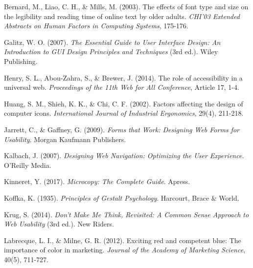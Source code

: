 \documentclass[12pt,a4paper,oneside]{article}
\begin{document}
\begin{flushleft}

Bernard, M., Liao, C. H., \& Mills, M. (2003). The effects of font type and size on the legibility and reading time of online text by older adults. \textit{CHI'03 Extended Abstracts on Human Factors in Computing Systems}, 175-176.

\vspace{0.5cm}

Galitz, W. O. (2007). \textit{The Essential Guide to User Interface Design: An Introduction to GUI Design Principles and Techniques} (3rd ed.). Wiley Publishing.

\vspace{0.5cm}

Henry, S. L., Abou-Zahra, S., \& Brewer, J. (2014). The role of accessibility in a universal web. \textit{Proceedings of the 11th Web for All Conference}, Article 17, 1-4.

\vspace{0.5cm}

Huang, S. M., Shieh, K. K., \& Chi, C. F. (2002). Factors affecting the design of computer icons. \textit{International Journal of Industrial Ergonomics}, 29(4), 211-218.

\vspace{0.5cm}

Jarrett, C., \& Gaffney, G. (2009). \textit{Forms that Work: Designing Web Forms for Usability}. Morgan Kaufmann Publishers.

\vspace{0.5cm}

Kalbach, J. (2007). \textit{Designing Web Navigation: Optimizing the User Experience}. O'Reilly Media.

\vspace{0.5cm}

Kinneret, Y. (2017). \textit{Microcopy: The Complete Guide}. Apress.

\vspace{0.5cm}

Koffka, K. (1935). \textit{Principles of Gestalt Psychology}. Harcourt, Brace \& World.

\vspace{0.5cm}

Krug, S. (2014). \textit{Don't Make Me Think, Revisited: A Common Sense Approach to Web Usability} (3rd ed.). New Riders.

\vspace{0.5cm}

Labrecque, L. I., \& Milne, G. R. (2012). Exciting red and competent blue: The importance of color in marketing. \textit{Journal of the Academy of Marketing Science}, 40(5), 711-727.


\end{flushleft}
\end{document}
